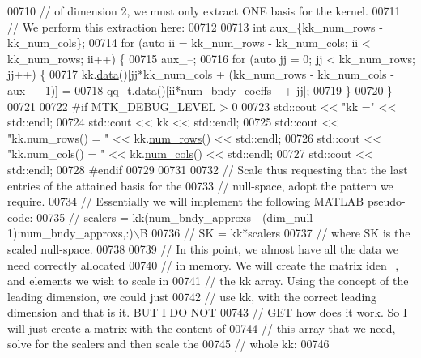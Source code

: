 \begin{DoxyCode}
{{00710   \textcolor{comment}{// of dimension 2, we must only extract ONE basis for the kernel.}
00711   \textcolor{comment}{// We perform this extraction here:}
00712 
00713   \textcolor{keywordtype}{int} aux\_\{kk\_num\_rows - kk\_num\_cols\};
00714   \textcolor{keywordflow}{for} (\textcolor{keyword}{auto} ii = kk\_num\_rows - kk\_num\_cols; ii < kk\_num\_rows; ii++) \{
00715     aux\_--;
00716     \textcolor{keywordflow}{for} (\textcolor{keyword}{auto} jj = 0; jj < kk\_num\_rows; jj++) \{
00717       kk.\hyperlink{classmtk_1_1DenseMatrix_a16b3ff56feb2658b9fc7147d1de4d8e7}{data}()[jj*kk\_num\_cols + (kk\_num\_rows - kk\_num\_cols - aux\_ - 1)] =
00718         qq\_t.\hyperlink{classmtk_1_1DenseMatrix_a16b3ff56feb2658b9fc7147d1de4d8e7}{data}()[ii*num\_bndy\_coeffs\_ + jj];
00719     \}
00720   \}
00721 
00722 \textcolor{preprocessor}{  #if MTK\_DEBUG\_LEVEL > 0}
00723   std::cout << \textcolor{stringliteral}{"kk ="} << std::endl;
00724   std::cout << kk << std::endl;
00725   std::cout << \textcolor{stringliteral}{"kk.num\_rows() = "} << kk.\hyperlink{classmtk_1_1DenseMatrix_a17d8d3b9cc0926044b6972dd190a5c21}{num\_rows}() << std::endl;
00726   std::cout << \textcolor{stringliteral}{"kk.num\_cols() = "} << kk.\hyperlink{classmtk_1_1DenseMatrix_af6f78373aaf2136f0c78974d7c8de0a8}{num\_cols}() << std::endl;
00727   std::cout << std::endl;
00728 \textcolor{preprocessor}{  #endif}
00729 
00731 
00732   \textcolor{comment}{// Scale thus requesting that the last entries of the attained basis for the}
00733   \textcolor{comment}{// null-space, adopt the pattern we require.}
00734   \textcolor{comment}{// Essentially we will implement the following MATLAB pseudo-code:}
00735   \textcolor{comment}{//  scalers = kk(num\_bndy\_approxs - (dim\_null - 1):num\_bndy\_approxs,:)\(\backslash\)B}
00736   \textcolor{comment}{//  SK = kk*scalers}
00737   \textcolor{comment}{// where SK is the scaled null-space.}
00738 
00739   \textcolor{comment}{// In this point, we almost have all the data we need correctly allocated}
00740   \textcolor{comment}{// in memory. We will create the matrix iden\_, and elements we wish to scale in}
00741   \textcolor{comment}{// the kk array. Using the concept of the leading dimension, we could just}
00742   \textcolor{comment}{// use kk, with the correct leading dimension and that is it. BUT I DO NOT}
00743   \textcolor{comment}{// GET how does it work. So I will just create a matrix with the content of}
00744   \textcolor{comment}{// this array that we need, solve for the scalers and then scale the}
00745   \textcolor{comment}{// whole kk:}
00746 
}}
\end{DoxyCode}
